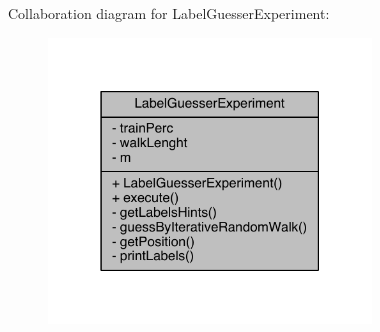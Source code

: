 Collaboration diagram for Label\+Guesser\+Experiment\+:
\nopagebreak
\begin{figure}[H]
\begin{center}
\leavevmode
\includegraphics[width=243pt]{class_label_guesser_experiment__coll__graph}
\end{center}
\end{figure}


